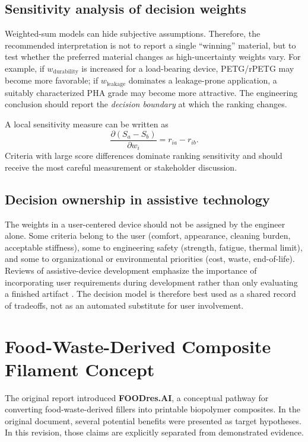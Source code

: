 \documentclass[11pt]{article}
\begin{document}
\subsection{Sensitivity analysis of decision weights}

Weighted-sum models can hide subjective assumptions. Therefore, the recommended interpretation is not to report a single ``winning'' material, but to test whether the preferred material changes as high-uncertainty weights vary. For example, if $w_{\mathrm{durability}}$ is increased for a load-bearing device, PETG/rPETG may become more favorable; if $w_{\mathrm{leakage}}$ dominates a leakage-prone application, a suitably characterized PHA grade may become more attractive. The engineering conclusion should report the \emph{decision boundary} at which the ranking changes.

A local sensitivity measure can be written as
\begin{equation}
\frac{\partial (S_a-S_b)}{\partial w_i}=r_{ia}-r_{ib}.
\end{equation}
Criteria with large score differences dominate ranking sensitivity and should receive the most careful measurement or stakeholder discussion.

\subsection{Decision ownership in assistive technology}

The weights in a user-centered device should not be assigned by the engineer alone. Some criteria belong to the user (comfort, appearance, cleaning burden, acceptable stiffness), some to engineering safety (strength, fatigue, thermal limit), and some to organizational or environmental priorities (cost, waste, end-of-life). Reviews of assistive-device development emphasize the importance of incorporating user requirements during development rather than only evaluating a finished artifact \cite{coelho2026,rasmussen2026}. The decision model is therefore best used as a shared record of tradeoffs, not as an automated substitute for user involvement.

\section{Food-Waste-Derived Composite Filament Concept}

The original report introduced \textbf{FOODres.AI}, a conceptual pathway for converting food-waste-derived fillers into printable biopolymer composites. In the original document, several potential benefits were presented as target hypotheses. In this revision, those claims are explicitly separated from demonstrated evidence.
\end{document}
